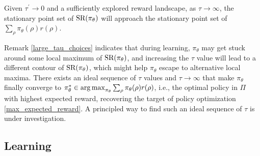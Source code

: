 \documentclass{article} %
\begin{document}
\begin{remk}
\label{large_tau_choices}
	Given $\tau^{\prime} \to 0$ and a sufficiently explored reward landscape, as $\tau \to \infty$, the stationary point set of $\text{SR}(\pi_\theta)$ will approach the stationary point set of $\sum_{\rho}{ \pi_\theta(\rho) r(\rho) }$.
\end{remk}

Remark \ref{large_tau_choices} indicates that during learning, $\pi_\theta$ may get stuck around some local maximum of $\text{SR}(\pi_\theta)$, and increasing the $\tau$ value will lead to a different contour of $\text{SR}(\pi_\theta)$, which might help $\pi_\theta$ escape to alternative local maxima. There exists an ideal sequence of $\tau$ values and $\tau \to \infty$ that make $\pi_\theta$ finally converge to $\pi_\theta^* \in \operatorname*{arg\,max}_{\pi_\theta}{ \sum_{\rho}{\pi_\theta(\rho) r(\rho)} }$, i.e., the optimal policy in $\Pi$ with highest expected reward, recovering the target of policy optimization \cref{max_expected_reward}. A principled way to find such an ideal sequence of $\tau$ is under investigation.

\subsection{Learning}
\end{document}
